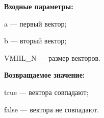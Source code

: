 \textbf{Входные параметры:}

  a --- первый вектор;
  
 b --- вторый вектор;
 
 VMHL\_N --- размер векторов.

\textbf{Возвращаемое значение:}

 true --- вектора совпадают;
 
 false --- вектора не совпадают.